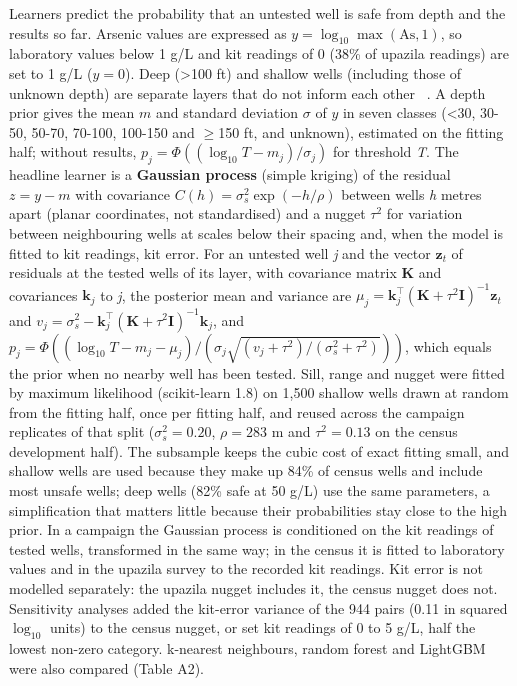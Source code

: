 \documentclass[sustainability,article,submit,pdftex,moreauthors]{Definitions/mdpi}
\begin{document}
Learners predict the probability that an untested well is safe from depth and the results so far. Arsenic values are expressed as $y = \log_{10} \max(\mathrm{As}, 1)$, so laboratory values below 1 \textmu{}g/L and kit readings of 0 (38\% of upazila readings) are set to 1 \textmu{}g/L ($y = 0$). Deep (>100 ft) and shallow wells (including those of unknown depth) are separate layers that do not inform each other ~\cite{vanGeen2003}. A depth prior gives the mean $m$ and standard deviation $\sigma$ of $y$ in seven classes (<30, 30-50, 50-70, 70-100, 100-150 and $\geq$150 ft, and unknown), estimated on the fitting half; without results, $p_j = \Phi((\log_{10} T - m_j)/\sigma_j)$ for threshold \textit{T}. The headline learner is a \textbf{Gaussian process} (simple kriging) of the residual $z = y - m$ with covariance $C(h) = \sigma_s^2 \exp(-h/\rho)$ between wells \textit{h} metres apart (planar coordinates, not standardised) and a nugget $\tau^2$ for variation between neighbouring wells at scales below their spacing and, when the model is fitted to kit readings, kit error. For an untested well \textit{j} and the vector $\mathbf{z}_t$ of residuals at the tested wells of its layer, with covariance matrix $\mathbf{K}$ and covariances $\mathbf{k}_j$ to \textit{j}, the posterior mean and variance are $\mu_j = \mathbf{k}_j^{\top} (\mathbf{K} + \tau^2 \mathbf{I})^{-1} \mathbf{z}_t$ and $v_j = \sigma_s^2 - \mathbf{k}_j^{\top} (\mathbf{K} + \tau^2 \mathbf{I})^{-1} \mathbf{k}_j$, and $p_j = \Phi((\log_{10} T - m_j - \mu_j)/(\sigma_j \sqrt{(v_j + \tau^2)/(\sigma_s^2 + \tau^2)}))$, which equals the prior when no nearby well has been tested. Sill, range and nugget were fitted by maximum likelihood (scikit-learn 1.8) on 1,500 shallow wells drawn at random from the fitting half, once per fitting half, and reused across the campaign replicates of that split ($\sigma_s^2 = 0.20$, $\rho = 283$ m and $\tau^2 = 0.13$ on the census development half). The subsample keeps the cubic cost of exact fitting small, and shallow wells are used because they make up 84\% of census wells and include most unsafe wells; deep wells (82\% safe at 50 \textmu{}g/L) use the same parameters, a simplification that matters little because their probabilities stay close to the high prior. In a campaign the Gaussian process is conditioned on the kit readings of tested wells, transformed in the same way; in the census it is fitted to laboratory values and in the upazila survey to the recorded kit readings. Kit error is not modelled separately: the upazila nugget includes it, the census nugget does not. Sensitivity analyses added the kit-error variance of the 944 pairs (0.11 in squared $\log_{10}$ units) to the census nugget, or set kit readings of 0 to 5 \textmu{}g/L, half the lowest non-zero category. k-nearest neighbours, random forest and LightGBM were also compared (Table A2).
\end{document}
